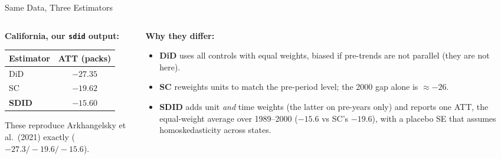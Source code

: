 \documentclass[main.tex]{subfiles}
\begin{document}
\begin{frame}{Same Data, Three Estimators}

  \begin{columns}[T]
    \begin{column}{0.46\textwidth}
      \textbf{California, our \texttt{sdid} output:}
      \smallskip
      \footnotesize
      \begin{tabular}{lc}
        \toprule
        Estimator & ATT (packs) \\
        \midrule
        DiD  & $-27.35$ \\
        SC   & $-19.62$ \\
        \textbf{SDID} & $\mathbf{-15.60}$ \\
        \bottomrule
      \end{tabular}

      \medskip
      \normalsize These reproduce Arkhangelsky et al.\ (2021) exactly
      ($-27.3 / -19.6 / -15.6$).
    \end{column}
    \begin{column}{0.50\textwidth}
      \textbf{Why they differ:}
      \begin{itemize}\small
        \item \textbf{DiD} uses all controls with equal weights, biased
          if pre-trends are not parallel (they are not here).
        \item \textbf{SC} reweights units to match the pre-period level;
          the 2000 gap alone is $\approx -26$.
        \item \textbf{SDID} adds unit \emph{and} time weights (the latter on
          pre-years only) and reports one ATT, the equal-weight average over
          1989--2000 ($-15.6$ vs SC's $-19.6$), with a placebo SE that
          assumes homoskedasticity across states.
      \end{itemize}
    \end{column}
  \end{columns}

\end{frame}
\end{document}
